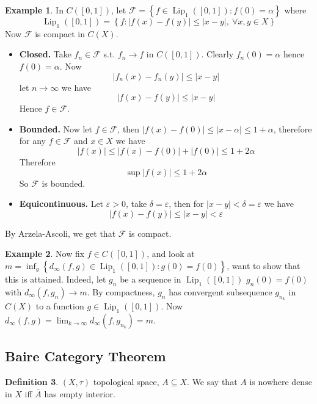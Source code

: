 \documentclass[11pt,a4paper]{article}
\theoremstyle{definition}
\newtheorem{definition}{Definition}[section]
\newtheorem{example}[definition]{Example}
\theoremstyle{plain}
\theoremstyle{remark}
\renewcommand{\set}[1]{\left\{ #1 \right\}}
\newcommand{\abs}[1]{\lvert #1 \rvert}
\newcommand{\1}{\mathbbm{1}}
\begin{document}
\begin{example}
    In $C([0,1])$, let $\mathcal{F} = \set{f \in \operatorname{Lip}_1([0,1]) \colon f(0) = \alpha}$ where 
    $$\operatorname{Lip}_1([0,1]) = \set{f \colon \abs{f(x) - f(y)} \le \abs{x-y}, \ \forall x, y \in X}$$
    Now $\mathcal{F}$ is compact in $C(X)$. 
    \begin{itemize}
        \item \textbf{Closed.} Take $f_n \in \mathcal{F}$ s.t. $f_n \to f$ in $C([0,1])$. Clearly $f_n(0) = \alpha$ hence $f(0) = \alpha$. Now 
        $$\abs{f_n(x) - f_n(y)} \le \abs{x-y}$$
        let $n \to \infty$ we have 
        $$\abs{f(x) - f(y)} \le \abs{x-y}$$
        Hence $f \in \mathcal{F}$.

        \item \textbf{Bounded.} Now let $f \in \mathcal{F}$, then $\abs{f(x) - f(0)} \le \abs{x - \alpha} \le 1 + \alpha$, therefore for any $f \in \mathcal{F}$ and $x \in X$ we have
        $$\abs{f(x)} \le \abs{f(x) - f(0)} + \abs{f(0)} \le 1 + 2 \alpha$$
        Therefore 
        $$\sup \abs{f(x)} \le 1 + 2 \alpha$$
        So $\mathcal{F}$ is bounded.

        \item \textbf{Equicontinuous.} Let $\varepsilon > 0$, take $\delta = \varepsilon$, then for $\abs{x-y} < \delta = \varepsilon$ we have 
        $$\abs{f(x) - f(y)} \le \abs{x-y} < \varepsilon$$
    \end{itemize} 
    By Arzela-Ascoli, we get that $\mathcal{F}$ is compact.
\end{example}

\begin{example}
    Now fix $f \in C([0,1])$, and look at $m = \inf_{g} \set{d_\infty (f,g) \in \operatorname{Lip}_1 ([0,1]) \colon g(0) = f(0)}$, want to show that this is attained. 
    Indeed, let $g_n$ be a sequence in $\operatorname{Lip}_1([0,1])$ $g_n(0) = f(0)$ with $d_\infty(f, g_n) \to m$. By compactness, $g_n$ has convergent subsequence $g_{n_k}$ in $C(X)$ to a function 
    $g \in \operatorname{Lip}_1([0,1])$. Now $d_\infty(f,g) = \lim_{k \to \infty} d_\infty(f, g_{n_k}) = m$. 
\end{example}

\subsection{Baire Category Theorem}

\begin{definition}
    $(X, \tau)$ topological space, $A \subseteq X$. We say that $A$ is nowhere dense in $X$ iff $\overline{A}$ has empty interior.
\end{definition}
\end{document}
